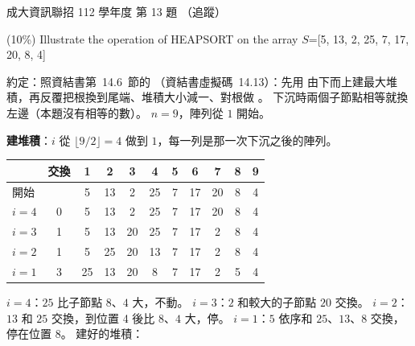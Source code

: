 \begin{pastexam}[label={px:ncku-112-prog-13}]{成大資訊聯招 112 學年度 第 13 題}
（追蹤）

(10\%) Illustrate the operation of HEAPSORT on the array $S$=[5, 13, 2, 25, 7, 17, 20, 8, 4]
\end{pastexam}

\begin{pastsoln}
約定：照資結書第~14.6~節的 （資結書虛擬碼~14.13）：先用
 由下而上建最大堆積，再反覆把根換到尾端、堆積大小減一、對根做
。 下沉時兩個子節點相等就換左邊（本題沒有相等的數）。 $n = 9$，陣列從 $1$
開始。

\textbf{建堆積}：$i$ 從 $\lfloor 9/2 \rfloor = 4$ 做到 $1$，每一列是那一次下沉之後的陣列。
\begin{center}
\small
\begin{tabular}{lc*{9}{c}}
\toprule
& 交換 & 1 & 2 & 3 & 4 & 5 & 6 & 7 & 8 & 9 \\
\midrule
開始 & & 5 & 13 & 2 & 25 & 7 & 17 & 20 & 8 & 4 \\
$i = 4$ & 0 & 5 & 13 & 2 & 25 & 7 & 17 & 20 & 8 & 4 \\
$i = 3$ & 1 & 5 & 13 & 20 & 25 & 7 & 17 & 2 & 8 & 4 \\
$i = 2$ & 1 & 5 & 25 & 20 & 13 & 7 & 17 & 2 & 8 & 4 \\
$i = 1$ & 3 & 25 & 13 & 20 & 8 & 7 & 17 & 2 & 5 & 4 \\
\bottomrule
\end{tabular}
\end{center}
$i = 4$：$25$ 比子節點 $8$、$4$ 大，不動。 $i = 3$：$2$ 和較大的子節點 $20$ 交換。 $i = 2$：
$13$ 和 $25$ 交換，到位置 4 後比 $8$、$4$ 大，停。 $i = 1$：$5$ 依序和 $25$、$13$、$8$ 交換，
停在位置 8。 建好的堆積：

\begin{center}
\end{center}


\end{pastsoln}
